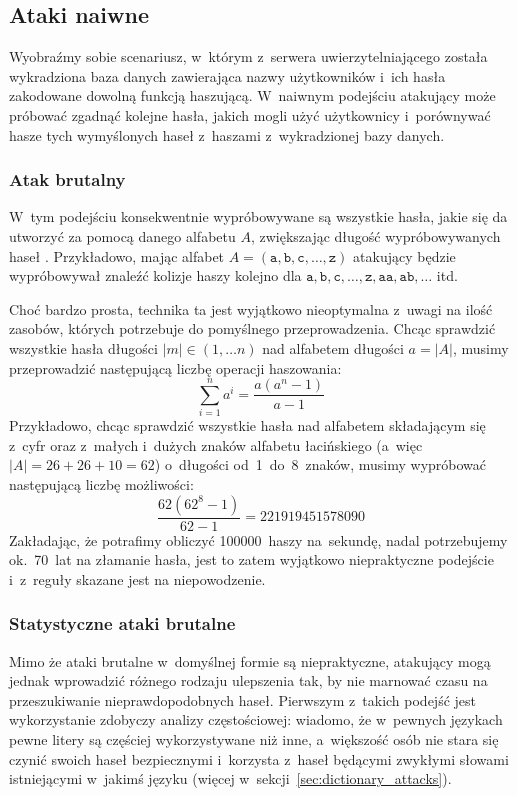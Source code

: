 \documentclass[12pt,a4paper,twoside]{article}
\begin{document}
\subsection{Ataki naiwne}

Wyobraźmy sobie scenariusz, w~którym z~serwera uwierzytelniającego została
wykradziona baza danych zawierająca nazwy użytkowników i~ich hasła zakodowane
dowolną funkcją haszującą. W~naiwnym podejściu atakujący może próbować zgadnąć
kolejne hasła, jakich mogli użyć użytkownicy i~porównywać hasze tych
wymyślonych haseł z~haszami z~wykradzionej bazy danych.

\subsubsection{Atak brutalny}

W~tym podejściu konsekwentnie wypróbowywane są wszystkie hasła, jakie się da
utworzyć za pomocą danego alfabetu $A$, zwiększając długość wypróbowywanych
haseł . Przykładowo, mając alfabet $A=(\mathtt{a},
\mathtt{b}, \mathtt{c}, \ldots, \mathtt{z})$ atakujący będzie wypróbowywał
znaleźć kolizje haszy kolejno dla $\mathtt{a}, \mathtt{b}, \mathtt{c}, \ldots,
\mathtt{z}, \mathtt{aa}, \mathtt{ab}, \ldots$ itd.

Choć bardzo prosta, technika ta jest wyjątkowo nieoptymalna z~uwagi na ilość
zasobów, których potrzebuje do pomyślnego przeprowadzenia. Chcąc sprawdzić
wszystkie hasła długości $|m| \in (1, \ldots n)$ nad alfabetem długości
$a=|A|$, musimy przeprowadzić następującą liczbę operacji haszowania:
    $$\sum_{i=1}^n a^i = \frac{a(a^n-1)}{a-1}$$
Przykładowo, chcąc sprawdzić wszystkie hasła nad alfabetem składającym się
z~cyfr oraz z~małych i~dużych znaków alfabetu łacińskiego (a~więc $|A| =
26+26+10 = 62$) o~długości od~1~do~8~znaków, musimy wypróbować następującą
liczbę możliwości:
    $$\frac{62(62^8-1)}{62-1} = \num{221919451578090}$$
Zakładając, że potrafimy obliczyć 100000~haszy na~sekundę, nadal potrzebujemy
ok.~70~lat na złamanie hasła, jest to zatem wyjątkowo niepraktyczne podejście
i~z~reguły skazane jest na niepowodzenie.

\subsubsection{Statystyczne ataki brutalne}

Mimo że ataki brutalne w~domyślnej formie są niepraktyczne, atakujący mogą
jednak wprowadzić różnego rodzaju ulepszenia tak, by nie marnować czasu na
przeszukiwanie nieprawdopodobnych haseł. Pierwszym z~takich podejść jest
wykorzystanie zdobyczy analizy częstościowej: wiadomo, że w~pewnych językach
pewne litery są częściej wykorzystywane niż inne, a~większość osób nie stara
się czynić swoich haseł bezpiecznymi i~korzysta z~haseł będącymi zwykłymi
słowami istniejącymi w~jakimś języku (więcej
w~sekcji~\ref{sec:dictionary_attacks}).
\end{document}
